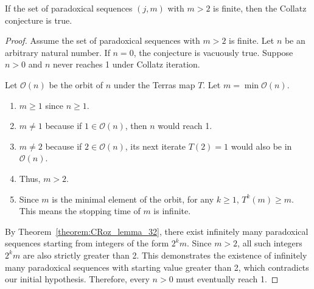\begin{corollary}\label{corollary:CRoz_cor_33}\leanok
If the set of paradoxical sequences $(j, m)$ with $m > 2$ is finite, then the Collatz conjecture is true.
\end{corollary}
\begin{proof}\leanok
Assume the set of paradoxical sequences with $m > 2$ is finite. Let $n$ be an arbitrary natural number. If $n = 0$, the conjecture is vacuously true. Suppose $n > 0$ and $n$ never reaches 1 under Collatz iteration.

Let $\mathcal{O}(n)$ be the orbit of $n$ under the Terras map $T$. Let $m = \min \mathcal{O}(n)$.
\begin{enumerate}
    \item $m \ge 1$ since $n \ge 1$.
    \item $m \neq 1$ because if $1 \in \mathcal{O}(n)$, then $n$ would reach 1.
    \item $m \neq 2$ because if $2 \in \mathcal{O}(n)$, its next iterate $T(2) = 1$ would also be in $\mathcal{O}(n)$.
    \item Thus, $m > 2$.
    \item Since $m$ is the minimal element of the orbit, for any $k \ge 1$, $T^k(m) \ge m$. This means the stopping time of $m$ is infinite.
\end{enumerate}

By Theorem~\ref{theorem:CRoz_lemma_32}, there exist infinitely many paradoxical sequences starting from integers of the form $2^k m$.
Since $m > 2$, all such integers $2^k m$ are also strictly greater than 2.
This demonstrates the existence of infinitely many paradoxical sequences with starting value greater than 2, which contradicts our initial hypothesis.
Therefore, every $n > 0$ must eventually reach 1.
\end{proof}
